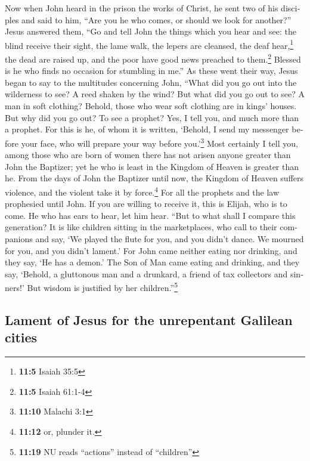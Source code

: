 \begin{paracol}{2}
\begin{otherlanguage}{english}
 Now when John heard in the prison the works of Christ, he
sent two of his disciples  and said to him, ``Are you he
who comes, or should we look for another?''  Jesus
answered them, ``Go and tell John the things which you hear and see:
 the blind receive their sight, the lame walk, the lepers
are cleansed, the deaf hear,\footnote{\textbf{11:5} Isaiah 35:5} the
dead are raised up, and the poor have good news preached to
them.\footnote{\textbf{11:5} Isaiah 61:1-4}  Blessed is he
who finds no occasion for stumbling in me.''  As these
went their way, Jesus began to say to the multitudes concerning John,
``What did you go out into the wilderness to see? A reed shaken by the
wind?  But what did you go out to see? A man in soft
clothing? Behold, those who wear soft clothing are in kings' houses.
 But why did you go out? To see a prophet? Yes, I tell
you, and much more than a prophet.  For this is he, of
whom it is written, `Behold, I send my messenger before your face, who
will prepare your way before you.'\footnote{\textbf{11:10} Malachi 3:1}
 Most certainly I tell you, among those who are born of
women there has not arisen anyone greater than John the Baptizer; yet he
who is least in the Kingdom of Heaven is greater than he.
 From the days of John the Baptizer until now, the
Kingdom of Heaven suffers violence, and the violent take it by
force.\footnote{\textbf{11:12} or, plunder it.}  For all
the prophets and the law prophesied until John.  If you
are willing to receive it, this is Elijah, who is to come.
 He who has ears to hear, let him hear. 
``But to what shall I compare this generation? It is like children
sitting in the marketplaces, who call to their companions
 and say, `We played the flute for you, and you didn't
dance. We mourned for you, and you didn't lament.'  For
John came neither eating nor drinking, and they say, `He has a demon.'
 The Son of Man came eating and drinking, and they say,
`Behold, a gluttonous man and a drunkard, a friend of tax collectors and
sinners!' But wisdom is justified by her children.''\footnote{\textbf{11:19}
  NU reads ``actions'' instead of ``children''}

\hypertarget{lament-of-jesus-for-the-unrepentant-galilean-cities}{%
\subsection{Lament of Jesus for the unrepentant Galilean
cities}\label{lament-of-jesus-for-the-unrepentant-galilean-cities}}


\end{otherlanguage}
\end{paracol}
